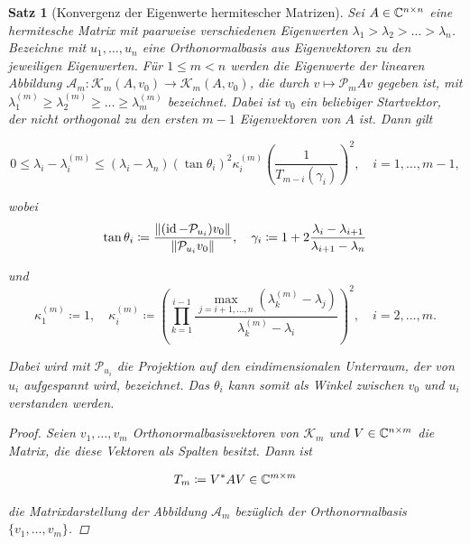 \documentclass{article}
\theoremstyle{plain}
\newtheorem{theorem}    {Satz}   [section]
\begin{document}
\begin{theorem}[Konvergenz der Eigenwerte hermitescher Matrizen]
	Sei $A \in \mathbb{C}^{n \times n}$ eine hermitesche Matrix mit paarweise verschiedenen Eigenwerten $\lambda_1 > \lambda_2 > \dots > \lambda_n$. Bezeichne mit $u_1,\dots,u_n$ eine Orthonormalbasis aus Eigenvektoren zu den jeweiligen Eigenwerten. Für $1 \le m < n$ werden die Eigenwerte der linearen Abbildung $\mathcal{A}_m: \mathcal{K}_m(A,v_0)\rightarrow \mathcal{K}_m(A,v_0)$, die durch $v \mapsto \mathcal{P}_mAv$ gegeben ist,  mit $\lambda_1^{(m)} \ge \lambda_2^{(m)} \ge \dots \ge \lambda_m^{(m)}$ bezeichnet. Dabei ist $v_0$ ein beliebiger Startvektor, der nicht orthogonal zu den ersten $m-1$ Eigenvektoren von $A$ ist. Dann gilt

	\begin{equation}
		\label{konvergenz Eigenwerte}
		0 \le \lambda_i - \lambda_i^{(m)} \le (\lambda_i -\lambda_n) (\tan\theta_i)^2 \kappa_i^{(m)} \left(\frac{1}{T_{m-i}(\gamma_i)}\right)^2, \quad i=1,\dots,m-1,
	\end{equation}

	wobei
	\begin{equation*}
		\tan \theta_i \coloneqq \frac{{\left \| (\operatorname{id} - \mathcal{P}_{u_i})v_0 \right \|}_{}}{{\left \|  \mathcal{P}_{u_i}v_0 \right \|}_{}}, \quad \gamma_i \coloneqq 1+2 \frac{\lambda_i-\lambda_{i+1}}{\lambda_{i+1} -\lambda_n}
	\end{equation*}

	und
	\begin{equation*}
		\kappa_1^{(m)} \coloneqq 1, \quad \kappa_i^{(m)} \coloneqq \left(\prod_{k=1}^{i-1} \frac{\max_{j=i+1,\dots,n} (\lambda_k^{(m)} - \lambda_j)}{\lambda_k^{(m)} - \lambda_i}\right)^2, \quad i = 2,\dots,m.
	\end{equation*}

	Dabei wird mit $\mathcal{P}_{u_i}$ die Projektion auf den eindimensionalen Unterraum, der von $u_i$ aufgespannt wird, bezeichnet. Das $\theta_i$ kann somit als Winkel zwischen $v_0$ und $u_i$  verstanden werden.
	\begin{proof}

	Seien $v_1, \dots, v_m$ Orthonormalbasisvektoren von $\mathcal{K}_m$ und $V \in \mathbb{C}^{n\times m}$ die Matrix, die diese Vektoren als Spalten besitzt. Dann ist

	\begin{equation*}
		T_m \coloneqq V^* A V \in \mathbb{C}^{m\times m}
	\end{equation*}

	die Matrixdarstellung der Abbildung $\mathcal{A}_m$ bezüglich der Orthonormalbasis $\{v_1,\dots,v_m\}$.


\end{proof}
\end{theorem}
\end{document}
